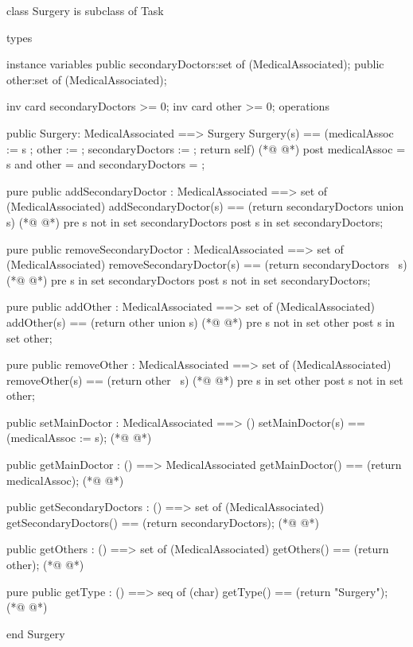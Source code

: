 \begin{vdmpp}[breaklines=true]
class Surgery is subclass of Task

types

instance variables
  public secondaryDoctors:set of (MedicalAssociated);
  public other:set of (MedicalAssociated);
  
  inv card secondaryDoctors >= 0;
  inv card other >= 0;
operations

 public Surgery: MedicalAssociated ==> Surgery
  Surgery(s) == (medicalAssoc := s ; other := {}; secondaryDoctors := {}; return self)
(*@
\label{Surgery:15}
@*)
 post medicalAssoc = s and other = {} and secondaryDoctors = {};
 
 pure public addSecondaryDoctor : MedicalAssociated ==> set of (MedicalAssociated)
  addSecondaryDoctor(s) == (return secondaryDoctors union {s})
(*@
\label{addSecondaryDoctor:19}
@*)
 pre s not in set secondaryDoctors
 post s in set secondaryDoctors;
  
 pure public removeSecondaryDoctor : MedicalAssociated ==> set of (MedicalAssociated)
  removeSecondaryDoctor(s) == (return secondaryDoctors \ {s})
(*@
\label{removeSecondaryDoctor:24}
@*)
 pre s in set secondaryDoctors
 post s not in set secondaryDoctors;
  
 pure public addOther : MedicalAssociated ==> set of (MedicalAssociated)
  addOther(s) == (return other union {s})
(*@
\label{addOther:29}
@*)
 pre s not in set other
 post s in set other;
  
 pure public removeOther : MedicalAssociated ==> set of (MedicalAssociated)
  removeOther(s) == (return other \ {s})
(*@
\label{removeOther:34}
@*)
 pre s in set other
 post s not in set other;
  
 public setMainDoctor : MedicalAssociated ==> ()
  setMainDoctor(s) == (medicalAssoc := s);
(*@
\label{setMainDoctor:39}
@*)
  
 public getMainDoctor : () ==> MedicalAssociated
  getMainDoctor() == (return medicalAssoc);
(*@
\label{getMainDoctor:42}
@*)
  
 public getSecondaryDoctors : () ==> set of (MedicalAssociated)
  getSecondaryDoctors() == (return secondaryDoctors);
(*@
\label{getSecondaryDoctors:45}
@*)
  
 public getOthers : () ==> set of (MedicalAssociated)
  getOthers() == (return other);
(*@
\label{getOthers:48}
@*)
  
 pure public getType : () ==> seq of (char) 
  getType() == (return "Surgery");
(*@
\label{getType:51}
@*)

end Surgery
\end{vdmpp}
